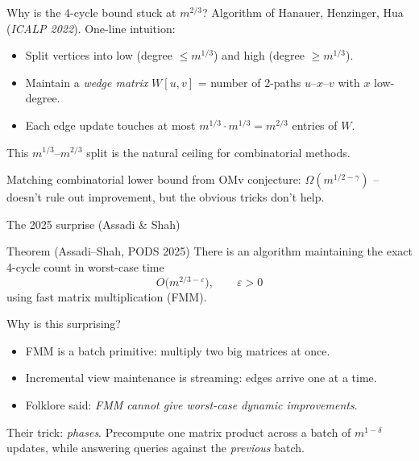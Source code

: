 \documentclass[aspectratio=169,10pt]{beamer}
\newcommand{\bigO}{O}
\begin{document}
\begin{frame}{Why is the 4-cycle bound stuck at $m^{2/3}$?}
  Algorithm of Hanauer, Henzinger, Hua (\textit{ICALP 2022}). One-line intuition:

  \vspace{0.4em}
  \begin{itemize}
    \item Split vertices into \alert{low} (degree $\le m^{1/3}$) and \alert{high} (degree $\ge m^{1/3}$).
    \item Maintain a \emph{wedge matrix} $W[u,v]$ \;=\; number of 2-paths $u$--$x$--$v$ with $x$ low-degree.
    \item Each edge update touches at most $m^{1/3} \cdot m^{1/3} = m^{2/3}$ entries of $W$.
  \end{itemize}

  \vspace{0.6em}
  This $m^{1/3}$--$m^{2/3}$ split is the \alert{natural ceiling for combinatorial methods}.

  \vspace{0.4em}
  Matching combinatorial lower bound from OMv conjecture: $\Omega(m^{1/2-\gamma})$ -- doesn't rule out improvement, but the obvious tricks don't help.
\end{frame}

\begin{frame}{The 2025 surprise (Assadi \& Shah)}
  \begin{block}{Theorem (Assadi--Shah, PODS 2025)}
    There is an algorithm maintaining the exact 4-cycle count in worst-case time
    \[
      \bigO\!\big(m^{2/3 - \varepsilon}\big), \qquad \varepsilon > 0
    \]
    using \alert{fast matrix multiplication} (FMM).
  \end{block}

  \vspace{0.4em}
  Why is this surprising?
  \begin{itemize}
    \item FMM is a \alert{batch} primitive: multiply two big matrices at once.
    \item Incremental view maintenance is \alert{streaming}: edges arrive one at a time.
    \item Folklore said: \emph{FMM cannot give worst-case dynamic improvements}.
  \end{itemize}

  \vspace{0.4em}
  Their trick: \emph{phases}. Precompute one matrix product across a batch of $m^{1-\delta}$ updates, while answering queries against the \emph{previous} batch.
\end{frame}
\end{document}
